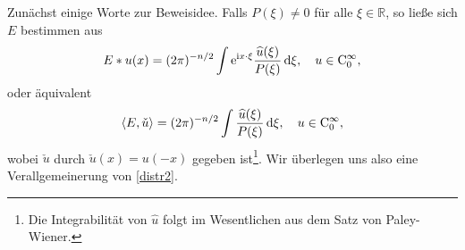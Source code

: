Zunächst einige Worte zur Beweisidee.  Falls $P(\xi)\neq 0$ für alle $\xi\in \mathbb R$, so ließe sich $E$ bestimmen aus
\begin{equation}\label{distr1}
E*u(x) = (2\pi)^{-n/2}\int \mathrm e^{\mathrm i x\cdot \xi} \frac{\widehat u(\xi)}{P(\xi)}\, \mathrm d\xi, \quad u \in \mathrm C_0^\infty,
\end{equation}
oder äquivalent
\begin{equation}\label{distr2}
\langle E,\check u\rangle = (2\pi)^{-n/2} \int \frac{\widehat u(\xi)}{P(\xi)}\, \mathrm d\xi, \quad u \in\mathrm C_0^\infty,
\end{equation}
wobei $\check u$ durch $\check u(x)=u(-x)$ gegeben ist\footnote{Die Integrabilität von $\widehat u$ folgt im Wesentlichen aus dem Satz von Paley-Wiener.}. Wir überlegen uns also eine Verallgemeinerung von \eqref{distr2}. 

